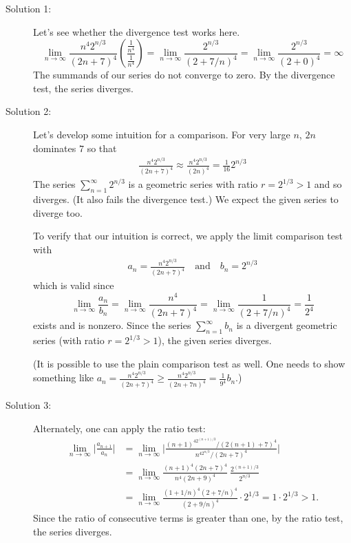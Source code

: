 \begin{solution}
\begin{description}
\item[Solution 1:]
Let's see whether the divergence test works here.
\[
\lim_{n\to\infty} \frac{n^4 2^{n/3}}{(2n+7)^4}\left(\frac{\frac{1}{n^4}}{\frac{1}{n^4}}\right) = \lim_{n\to\infty} \frac{2^{n/3}}{(2+7/n)^4} = \lim_{n\to\infty} \frac{2^{n/3}}{(2+0)^4} = \infty
\]
The summands of our series do not converge to zero. By the divergence
test, the series diverges.
\item[Solution 2:]
Let's develop some intuition for a comparison. For very large $n$, $2n$ dominates
$7$ so that
\begin{align*}
\frac{n^4 2^{n/3}}{(2n+7)^4}
\approx \frac{n^4 2^{n/3}}{(2n)^4}
=\frac{1}{16}2^{n/3}
\end{align*}
The series $\displaystyle \sum_{n=1}^{\infty} 2^{n/3}$
is a geometric series with ratio $r=2^{1/3}>1$ and so diverges. (It also fails the divergence test.)
We expect the given series to diverge too.

To verify that  our intuition is correct,
we apply the limit comparison test with
\begin{align*}
a_n= \frac{n^4 2^{n/3}}{(2n+7)^4} \quad\text{and}\quad b_n= 2^{n/3}
\end{align*}
which is valid since
\begin{equation*}
\lim_{n\rightarrow\infty} \frac{a_n}{b_n}
=\lim_{n\rightarrow\infty}\frac{n^4}{(2n+7)^4}
=\lim_{n\rightarrow\infty}\frac{1}{{(2+7/n)}^4}
=\frac{1}{2^4}
\end{equation*}
exists and is nonzero. Since the series $\sum\limits_{n=1}^\infty b_n$ is
a divergent geometric series (with ratio $r=2^{1/3}>1$),
the given series diverges.
\medskip

(It is possible to use the plain comparison test as well.
One needs  to show something like $a_n = \frac{n^4 2^{n/3}}{(2n+7)^4}
\ge \frac{n^4 2^{n/3}}{(2n+7n)^4} = \frac{1}{9^4}b_n$.)
\medskip

\item[Solution 3:]
Alternately, one can apply the ratio test:
\begin{align*}
\lim_{n\to\infty} \bigg| \frac{a_{n+1}}{a_n} \bigg|
&= \lim_{n\to\infty} \bigg| \frac{(n+1)^42^{(n+1)/3}/(2(n+1)+7)^4}{n^42^{n/3}/(2n+7)^4} \bigg| \\
&= \lim_{n\to\infty} \frac{(n+1)^4(2n+7)^4}{n^4(2n+9)^4}\  \frac{2^{(n+1)/3}}{2^{n/3}} \\
&=\lim_{n\to\infty} \frac{(1+1/n)^4(2+7/n)^4}{(2+9/n)^4} \cdot2^{1/3}
= 1\cdot2^{1/3} > 1.
\end{align*}
Since the ratio of consecutive terms is greater than one, by the ratio test, the series diverges.
\end{description}
\end{solution}




